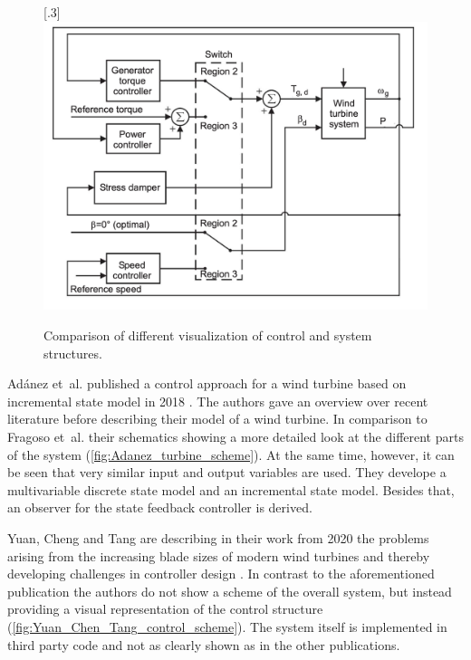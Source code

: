\begin{figure}[htp]
    [.3\textwidth]{\includegraphics[width=1\linewidth]{fig/Simani_2015_switching_control.png}}
%
    \caption{Comparison of different visualization of control and system structures.}
    \label{fig:different_schemes_compared}
\end{figure}

Adánez et~al. published a control approach for a wind turbine based on incremental state model in 2018 \cite{Adanez_et_al_2018}.
The authors gave an overview over recent literature before describing their model of a wind turbine.
In comparison to Fragoso et~al. their schematics showing a more detailed look at the different parts of the system (\autoref{fig:Adanez_turbine_scheme}).
At the same time, however, it can be seen that very similar input and output variables are used.
They develope a multivariable discrete state model and an incremental state model. Besides that, an observer for the state feedback controller is derived.



Yuan, Cheng and Tang are describing in their work from 2020 the problems arising from the increasing blade sizes of modern wind turbines and thereby developing challenges in controller design \cite{Yuan_Chen_Tang_2020}.
In contrast to the aforementioned publication the authors do not show a scheme of the overall system, but instead providing a visual representation of the control structure (\autoref{fig:Yuan_Chen_Tang_control_scheme}).
The system itself is implemented in third party code and not as clearly shown as in the other publications.

